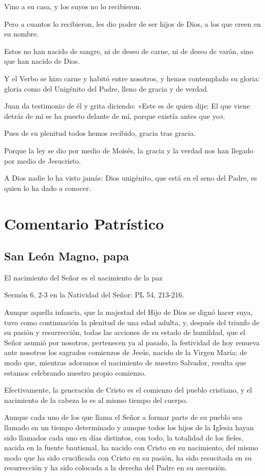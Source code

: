 Vino a su casa, y los suyos no lo recibieron.

Pero a cuantos lo recibieron, les dio poder de ser hijos de Dios, a los
que creen en su nombre.

Estos no han nacido de sangre, ni de deseo de carne, ni de deseo de
varón, sino que han nacido de Dios.

Y el Verbo se hizo carne y habitó entre nosotros, y hemos contemplado su
gloria: gloria como del Unigénito del Padre, lleno de gracia y de
verdad.

Juan da testimonio de él y grita diciendo: «Este es de quien dije: El
que viene detrás de mí se ha puesto delante de mí, porque existía antes
que yo».

Pues de su plenitud todos hemos recibido, gracia tras gracia.

Porque la ley se dio por medio de Moisés, la gracia y la verdad nos han
llegado por medio de Jesucristo.

A Dios nadie lo ha visto jamás: Dios unigénito, que está en el seno del
Padre, es quien lo ha dado a conocer.

\section{Comentario Patrístico}

\subsection{San León Magno, papa}

El nacimiento del Señor es el nacimiento de la paz

Sermón 6, 2-3 en la Natividad del Señor: PL 54, 213-216.

Aunque aquella infancia, que la majestad del Hijo de Dios se dignó hacer suya, tuvo como continuación la plenitud de una edad adulta, y, después del triunfo de su pasión y resurrección, todas las acciones de su estado de humildad, que el Señor asumió por nosotros, pertenecen ya al pasado, la festividad de hoy renueva ante nosotros los sagrados comienzos de Jesús, nacido de la Virgen María; de modo que, mientras adoramos el nacimiento de nuestro Salvador, resulta que estamos celebrando nuestro propio comienzo.

Efectivamente, la generación de Cristo es el comienzo del pueblo cristiano, y el nacimiento de la cabeza lo es al mismo tiempo del cuerpo.

Aunque cada uno de los que llama el Señor a formar parte de su pueblo sea llamado en un tiempo determinado y aunque todos los hijos de la Iglesia hayan sido llamados cada uno en días distintos, con todo, la totalidad de los fieles, nacida en la fuente bautismal, ha nacido con Cristo en su nacimiento, del mismo modo que ha sido crucificada con Cristo en su pasión, ha sido resucitada en su resurrección y ha sido colocada a la derecha del Padre en su ascensión.

